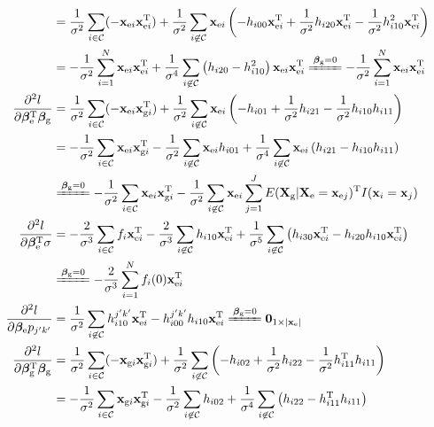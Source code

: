 \documentclass[10pt,a4paper]{article}
\def\bbetag{\bm{\beta}_{\text{g}}}
\def\bbetae{\bm{\beta}_{\text{e}}}
\def\bx{\mathbf{x}}
\def\bxgi{\mathbf{x}_{\text{g}i}}
\def\bxei{\mathbf{x}_{\text{e}i}}
\def\bxej{\mathbf{x}_{\text{e}j}}
\def\bxe{\mathbf{x}_{\text{e}}}
\def\bXg{\mathbf{X}_{\text{g}}}
\def\bXe{\mathbf{X}_{\text{e}}}
\begin{document}
\begin{align*}
&= \frac{1}{\sigma^2}\sum_{i \in \mathcal{C}} (-\bxei \bxei^{\text{T}}) + \frac{1}{\sigma^2} \sum_{i \not \in \mathcal{C}} \bxei \left( -h_{i00} \bxei^{\text{T}} + \frac{1}{\sigma^2} h_{i20}\bxei^{\text{T}} - \frac{1}{\sigma^2} h_{i10}^2 \bxei^{\text{T}} \right)\\
&= -\frac{1}{\sigma^2}\sum_{i =1}^N \bxei \bxei^{\text{T}} + \frac{1}{\sigma^4} \sum_{i \not \in \mathcal{C}} \left( h_{i20} - h_{i10}^2 \right)\bxei \bxei^{\text{T}} \xlongequal{\bbetag = 0} -\frac{1}{\sigma^2}\sum_{i =1}^N \bxei \bxei^{\text{T}} \\
\frac{\partial^2 l}{\partial \bbetae^{\text{T}} \bbetag} 
&= \frac{1}{\sigma^2}\sum_{i \in \mathcal{C}} (-\bxei \bxgi^{\text{T}}) + \frac{1}{\sigma^2} \sum_{i \not \in \mathcal{C}} \bxei \left( -h_{i01}
 + \frac{1}{\sigma^2} h_{i21} - \frac{1}{\sigma^2} h_{i10}h_{i11} \right)\\
 &= -\frac{1}{\sigma^2}\sum_{i \in \mathcal{C}} \bxei \bxgi^{\text{T}} - \frac{1}{\sigma^2} \sum_{i \not \in \mathcal{C}} \bxei h_{i01} + \frac{1}{\sigma^4} \sum_{i \not \in \mathcal{C}} \bxei\left(h_{i21} - h_{i10}h_{i11} \right) \\ & \xlongequal{\bbetag = 0} -\frac{1}{\sigma^2}\sum_{i \in \mathcal{C}} \bxei \bxgi^{\text{T}} - \frac{1}{\sigma^2} \sum_{i \not \in \mathcal{C}} \bxei \sum_{j=1}^J E(\bXg|\bXe = \bxej)^{\text{T}} I(\bx_i = \bx_j)  \\ 
\frac{\partial^2 l}{\partial \bbetae^{\text{T}} \sigma} 
&= -\frac{2}{\sigma^3}\sum_{i \in \mathcal{C}} f_i \bxei^{\text{T}} - \frac{2}{\sigma^3} \sum_{i \not \in \mathcal{C}} h_{i10} \bxei^{\text{T}} +  \frac{1}{\sigma^5} \sum_{i \not \in \mathcal{C}} \left(h_{i30}\bxei^{\text{T}} - h_{i20}h_{i10}\bxei^{\text{T}}  \right) \\
& \xlongequal{\bbetag = 0} -\frac{2}{\sigma^3}\sum_{i=1}^N f_i(0) \bxei^{\text{T}} \\
\frac{\partial^2 l}{\partial \bbetae p_{j'k'}} 
&= \frac{1}{\sigma^2} \sum_{i \not \in \mathcal{C}} h_{i10}^{j'k'}\bxei^{\text{T}} - h_{i00}^{j'k'}h_{i10}\bxei^{\text{T}} \xlongequal{\bbetag = 0} \mathbf{0}_{1 \times |\bxe|} \\
\frac{\partial^2 l}{\partial \bbetag^{\text{T}} \bbetag} 
&= \frac{1}{\sigma^2}\sum_{i \in \mathcal{C}} (-\bxgi \bxgi^{\text{T}}) + \frac{1}{\sigma^2} \sum_{i \not \in \mathcal{C}} \left( -h_{i02} + \frac{1}{\sigma^2}h_{i22} - \frac{1}{\sigma^2} h_{i11}^{\text{T}} h_{i11} \right)\\
&= -\frac{1}{\sigma^2}\sum_{i \in \mathcal{C}} \bxgi \bxgi^{\text{T}} - \frac{1}{\sigma^2} \sum_{i \not \in \mathcal{C}} h_{i02}  + \frac{1}{\sigma^4} \sum_{i \not \in \mathcal{C}} \left( h_{i22} - h_{i11}^{\text{T}} h_{i11}  \right)\\

\end{align*}
\end{document}
